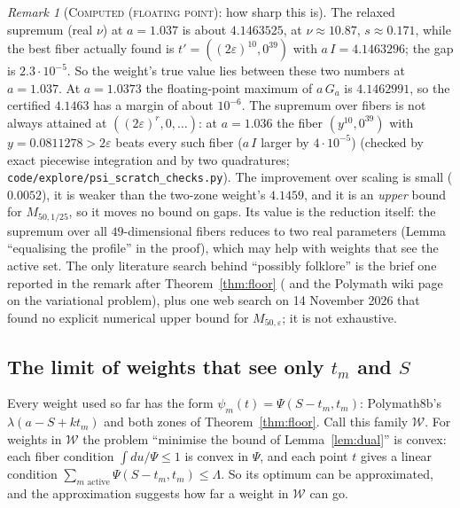 \documentclass[11pt]{amsart}
\theoremstyle{definition}
\theoremstyle{remark}
\newtheorem{remark}[theorem]{Remark}
\newcommand{\lbl}[1]{\textup{\textsc{#1}}}
\begin{document}
\begin{remark}[\lbl{Computed (floating point)}: how sharp this is]
The relaxed supremum (real $\nu$) at $a=1.037$ is about $4.1463525$, at
$\nu\approx10.87$, $s\approx0.171$, while the best fiber actually found is
$t'=((2\varepsilon)^{10},0^{39})$ with $a\,I=4.1463296$; the gap is
$2.3\cdot10^{-5}$. So the weight's true value lies between these two numbers
at $a=1.037$. At $a=1.0373$ the floating-point maximum of $a\,G_a$ is
$4.1462991$, so the certified $4.1463$ has a margin of about $10^{-6}$. The supremum over fibers is not always attained at
$((2\varepsilon)^r,0,\dots)$: at $a=1.036$ the fiber $(y^{10},0^{39})$ with
$y=0.0811278>2\varepsilon$ beats every such fiber ($a\,I$ larger by $4\cdot10^{-5}$)
(checked by exact piecewise integration and by two quadratures;
\texttt{code/explore/psi\_scratch\_checks.py}). The improvement over scaling is
small ($0.0052$), it is weaker than the two-zone weight's $4.1459$, and it is an
\emph{upper} bound for $M_{50,1/25}$, so it moves no bound on gaps. Its value is
the reduction itself: the supremum over all $49$-dimensional fibers reduces to
two real parameters (Lemma ``equalising the profile'' in the proof), which may
help with weights that see the active set. The only literature search behind
``possibly folklore'' is the brief one reported in the remark after
Theorem~\ref{thm:floor} (\cite{Pol14b} and the Polymath wiki page on the
variational problem), plus one web search on 14 November 2026 that found no
explicit numerical upper bound for $M_{50,\varepsilon}$; it is not exhaustive.
\end{remark}

\subsection*{The limit of weights that see only \texorpdfstring{$t_m$}{t\_m} and \texorpdfstring{$S$}{S}}
Every weight used so far has the form
$\psi_m(t)=\Psi(S-t_m,t_m)$: Polymath8b's $\lambda(a-S+kt_m)$ and both zones of
Theorem~\ref{thm:floor}. Call this family $\mathcal W$. For weights in
$\mathcal W$ the problem ``minimise the bound of Lemma~\ref{lem:dual}'' is
convex: each fiber condition $\int du/\Psi\le1$ is convex in $\Psi$, and each
point $t$ gives a linear condition $\sum_{m\text{ active}}\Psi(S-t_m,t_m)\le\Lambda$.
So its optimum can be approximated, and the approximation suggests how far a
weight in $\mathcal W$ can go.
\end{document}
